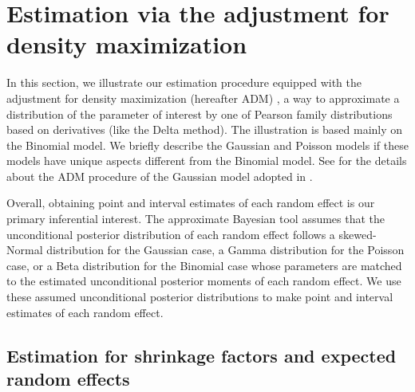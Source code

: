 \documentclass[article]{jss}
\begin{document}
\section[Estimation]{Estimation via the adjustment for density maximization}\label{sec3}

In this section, we illustrate our estimation procedure equipped with the adjustment for density maximization (hereafter ADM) \citep{carl1988, morris1997, tang2011}, a way to  approximate a distribution of the parameter of interest by one of Pearson family distributions based on derivatives (like the Delta method). The illustration is based mainly on the Binomial model. We briefly describe the Gaussian and Poisson models if these models have unique aspects different from the Binomial model. See \cite{kelly2014advances} for the details about the ADM procedure of the Gaussian model adopted in  .


Overall, obtaining point and interval estimates of each random effect is our primary inferential interest.  The approximate Bayesian tool assumes that the unconditional posterior distribution of each random effect follows a skewed-Normal distribution for the Gaussian case,  a Gamma distribution for the Poisson case, or a Beta distribution for the Binomial case whose parameters are matched to the estimated unconditional posterior moments of each random effect. We use these assumed unconditional posterior distributions to make point and interval estimates of each random effect. 

\subsection[shrinkage]{Estimation for shrinkage factors and expected random effects}\label{shrinkage}
\end{document}
